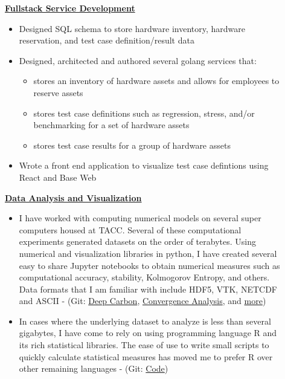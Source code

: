 \documentclass[11pt]{ltxdoc}
\begin{document}
  \begin{description}
 	\item[] \textbf{\underline{Fullstack Service Development}}
 	\begin{itemize}
 	  \item Designed SQL schema to store hardware inventory, hardware reservation, and test case definition/result data
 	  \item Designed, architected and authored several golang services that:
 	    \begin{itemize}
 	      \item stores an inventory of hardware assets and allows for employees to reserve assets
          \item stores test case definitions such as regression, stress, and/or benchmarking for a set of hardware assets
          \item stores test case results for a group of hardware assets
 	    \end{itemize}
 	  \item Wrote a front end application to visualize test case defintions using React and Base Web
 	\end{itemize}
    \item[] \textbf{\underline{Data Analysis and Visualization}}
    
      \begin{itemize}
      	\item I have worked with computing numerical models on several super computers housed at TACC. Several of these computational experiments generated datasets on the order of terabytes. Using numerical and visualization libraries in python, I have created several easy to share Jupyter notebooks to obtain numerical measures such as computational accuracy, stability, Kolmogorov Entropy, and others. Data formats that I am familiar with include HDF5, VTK, NETCDF and ASCII - (Git: \href{https://github.com/hlokavarapu/Prospectus/blob/master/SlideDeck/MeetingPresentation.ipynb}{Deep Carbon}, \href{https://github.com/EGP-CIG-REU/SECOND_PARTICLE_PAPER/blob/master/00JUPYTER_NOTEBOOKS/egp_time_dependent_annulus_v-02/egp_time_dependent_annulus_v-02-Exact.ipynb}{Convergence Analysis}, and \href{https://github.com/hlokavarapu/Geology_Journal/tree/master/00JUPYTER}{more})
        
        \item In cases where the underlying dataset to analyze is less than several gigabytes, I have come to rely on using programming language R and its rich statistical libraries. The ease of use to write small scripts to quickly calculate statistical measures has moved me to prefer R over other remaining languages - (Git: \href{https://github.com/hlokavarapu/computational_tools/tree/master/R_scripts}{Code})
        

\end{itemize}
\end{description}
\end{document}
